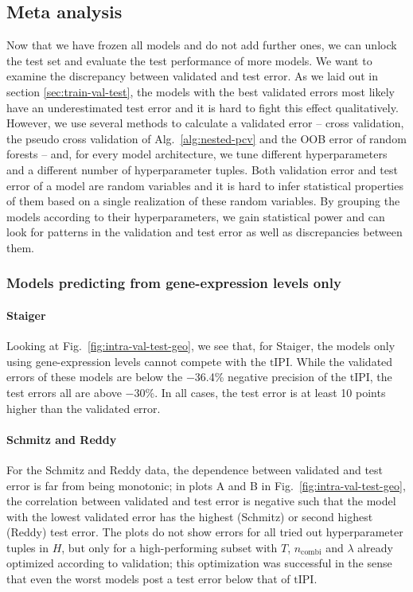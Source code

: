 \subsection{Meta analysis}\label{subsec:results-intra-meta}

Now that we have frozen all models and do not add further ones, we can unlock the test set and 
evaluate the test performance of more models. We want to examine the discrepancy between 
validated and test error. As we laid out in section \ref{sec:train-val-test}, the models with the 
best validated errors most likely have an underestimated test error and it is hard to fight this 
effect qualitatively. However, we use several methods to calculate a validated error -- cross 
validation, the pseudo cross validation of Alg.\ \ref{alg:nested-pcv} and the OOB error of random 
forests -- and, for every model architecture, we tune different hyperparameters and a different 
number of hyperparameter tuples. Both validation error and test error of a model are random 
variables and it is hard to infer statistical properties of them based on a single realization of 
these random variables. By grouping the models according to their hyperparameters, we gain 
statistical power and can look for patterns in the validation and test error as well as 
discrepancies between them.

\subsubsection{Models predicting from gene-expression levels only}



\paragraph{Staiger}
Looking at Fig.\ \ref{fig:intra-val-test-geo}, we see that, for Staiger, the models only using 
gene-expression levels cannot compete with the $\text{tIPI}$. While the validated errors of these 
models are 
below the \num{-36.4}\% negative precision of the tIPI, the test errors all are above \num{-30}\%. 
In all cases, the test error is at least 10 points higher than the validated error.  

\paragraph{Schmitz and Reddy}
For the Schmitz and Reddy data, the dependence between validated and test error is far from 
being monotonic; in plots A and B in Fig.\ \ref{fig:intra-val-test-geo}, the
correlation between validated and test 
error is negative such that the model with the lowest validated error has the highest 
(Schmitz) or second highest (Reddy) test error. The plots do not show errors for all tried out 
hyperparameter tuples in $H$, but only for a high-performing subset with $T$, $n_\text{combi}$ 
and $\lambda$ already 
optimized according to validation; this optimization was successful in the sense that even the 
worst models post a test error below that of $\text{tIPI}$.

